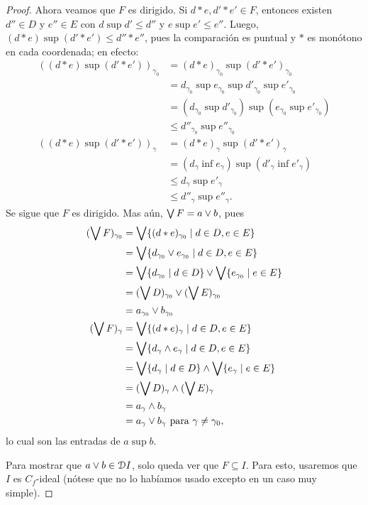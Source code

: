 \begin{proof}
  Ahora veamos que $F$ es dirigido.
  Si $d*e,d'*e'\in F$, entonces existen $d''\in D$ y $e''\in E$ con
  $d\sup d'\leq d''$ y $e\sup e'\leq e''$.
  Luego, $(d*e)\sup(d'*e')\leq d''*e''$, pues la comparación es
  puntual y $*$ es monótono en cada coordenada; en efecto:
  \begin{align*}
    ((d*e)\sup(d'*e'))_{\gamma_0}
    &= (d*e)_{\gamma_0} \sup (d'*e')_{\gamma_0} \\
    &= d_{\gamma_0}\sup e_{\gamma_0}\sup d'_{\gamma_0}\sup
      e'_{\gamma_0} \\
    &= (d_{\gamma_0}\sup d'_{\gamma_0})
      \sup(e_{\gamma_0}\sup e'_{\gamma_0}) \\
    &\leq d''_{\gamma_0} \sup e''_{\gamma_0}
    \\
    ((d*e)\sup(d'*e'))_{\gamma}
    &= (d*e)_{\gamma} \sup (d'*e')_{\gamma} \\
    &= (d_\gamma\inf e_\gamma)\sup(d'_\gamma\inf e'_\gamma) \\
    &\leq d_\gamma \sup e'_\gamma \\
    &\leq d''_\gamma \sup e''_\gamma.
  \end{align*}
  Se sigue que $F$ es dirigido.
  Mas aún, $\bigvee F = a\vee b$, pues
  \begin{align*}
    (\bigvee F)_{\gamma_0}
    &= \bigvee\{(d*e)_{\gamma_0} \mid d\in D,e\in E\} \\
    &= \bigvee\{d_{\gamma_0}\vee e_{\gamma_0} \mid d\in D,e\in E\} \\
    &= \bigvee\{d_{\gamma_0}\mid d\in D\}
      \vee \bigvee\{e_{\gamma_0}\mid e\in E\} \\
    &= (\bigvee D)_{\gamma_0} \vee (\bigvee E)_{\gamma_0} \\
    &= a_{\gamma_0} \vee b_{\gamma_0}
    \\
    (\bigvee F)_\gamma
    &= \bigvee\{(d*e)_\gamma\mid d\in D,e\in E\} \\
    &= \bigvee\{d_\gamma\wedge e_\gamma\mid d\in D,e\in E\} \\
    &= \bigvee\{d_\gamma\mid d\in D\}
      \wedge \bigvee\{e_\gamma\mid e\in E\} \\
    &= (\bigvee D)_\gamma \wedge (\bigvee E)_\gamma \\
    &= a_\gamma \wedge b_\gamma \\
    &= a_\gamma \vee b_\gamma \text{ para }\gamma\neq\gamma_0,
  \end{align*}
  lo cual son las entradas de $a\sup b$.

  Para mostrar que $a\vee b\in\mathcal D I$,
  solo queda ver que $F\subseteq I$.
  Para esto, usaremos que $I$ es $C_f$-ideal (nótese que no lo
  habíamos usado excepto en un caso muy simple).


\end{proof}
